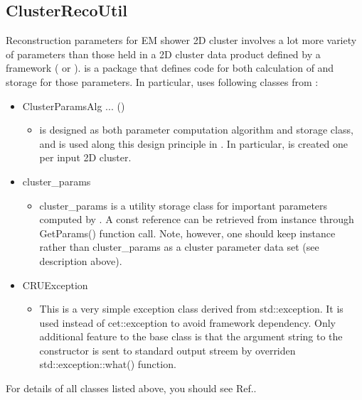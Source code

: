 \subsection{{\ttfamily ClusterRecoUtil}}
\label{sec:fmwk:external:cru}
Reconstruction parameters for EM shower 2D cluster involves a lot more variety of parameters than those held in a 2D cluster data product defined by a framework ({\larsoft} or {\larlight}). {\cru} is a package that defines code for both calculation of and storage for those parameters. In particular, {\cmtool} uses following {\CPP} classes from {\cru}:
\begin{itemize}
\item {\ttfamily ClusterParamsAlg ... (\cpan)}
  \begin{itemize}
    \item {\cpan} is designed as both parameter computation algorithm and storage class, and is used along this design principle in {\cmtool}. In particular, {\cpan} is created one per input 2D cluster.
  \end{itemize}
\item {\ttfamily cluster\_params}
  \begin{itemize}
    \item {\ttfamily cluster\_params} is a utility storage class for important parameters computed by \cpan. A const reference can be retrieved from {\cpan} instance through {\ttfamily GetParams()} function call. Note, however, one should keep {\cpan} instance rather than {\ttfamily cluster\_params} as a cluster parameter data set (see {\cpan} description above).
  \end{itemize}
\item {\ttfamily CRUException}
  \begin{itemize}
    \item This is a very simple exception class derived from {\ttfamily std::exception}. It is used instead of {\ttfamily cet::exception} to avoid framework dependency. Only additional feature to the base class is that the argument string to the constructor is sent to standard output streem by overriden {\ttfamily std::exception::what()} function.
  \end{itemize}
\end{itemize}

For details of all classes listed above, you should see Ref.\cite{ClusterRecoUtil}.

